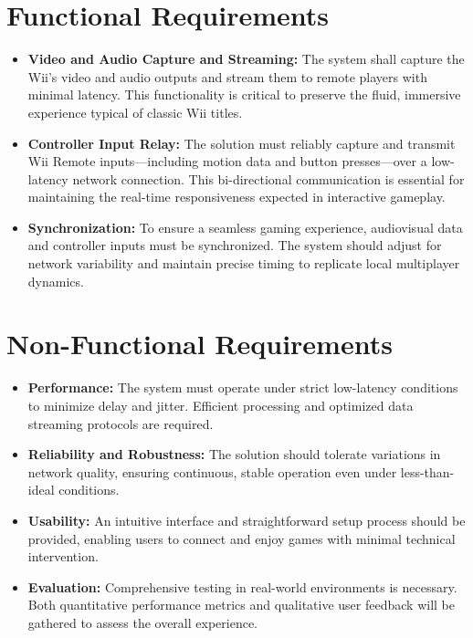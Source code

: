 \label{chapter:requirements}

\section{Functional Requirements}
\begin{itemize}
	\item \textbf{Video and Audio Capture and Streaming:}
	      The system shall capture the Wii’s video and audio outputs and stream them to remote players with minimal latency. This functionality is critical to preserve the fluid, immersive experience typical of classic Wii titles.

	\item   \textbf{Controller Input Relay:}
	      The solution must reliably capture and transmit Wii Remote inputs—including motion data and button presses—over a low-latency network connection. This bi-directional communication is essential for maintaining the real-time responsiveness expected in interactive gameplay.

	\item    \textbf{Synchronization:}
	      To ensure a seamless gaming experience, audiovisual data and controller inputs must be synchronized. The system should adjust for network variability and maintain precise timing to replicate local multiplayer dynamics.


\end{itemize}


\section{Non-Functional Requirements}
\begin{itemize}

	\item  \textbf{Performance:}
	      The system must operate under strict low-latency conditions to minimize delay and jitter. Efficient processing and optimized data streaming protocols are required.

	\item \textbf{Reliability and Robustness:}
	      The solution should tolerate variations in network quality, ensuring continuous, stable operation even under less-than-ideal conditions.

	\item \textbf{Usability:}
	      An intuitive interface and straightforward setup process should be provided, enabling users to connect and enjoy games with minimal technical intervention.

	\item \textbf{Evaluation:}
	      Comprehensive testing in real-world environments is necessary. Both quantitative performance metrics and qualitative user feedback will be gathered to assess the overall experience.


\end{itemize}
